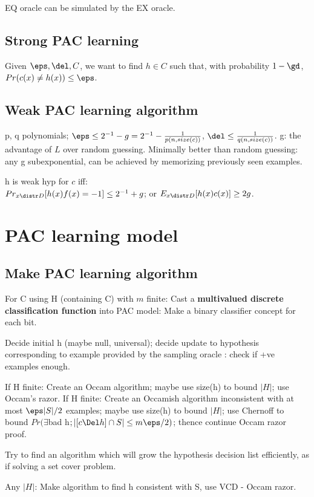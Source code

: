 \documentclass[oneside, article]{memoir}
\begin{document}
EQ oracle can be simulated by the EX oracle.

\subsection{Strong PAC learning}
Given $\eps, \del, C$, we want to find $h \in C$ such that, with probability $1 - \gd$, $Pr(c(x) \neq h(x)) \leq \eps$.

\subsection{Weak PAC learning algorithm}
p, q polynomials; $\eps \leq 2^{-1}-g = 2^{-1}-\frac{1}{p(n, size(c))}$, $\del \leq \frac{1}{q(n, size(c))}$. g: the advantage of $L$ over random guessing. Minimally better than random guessing: any g subexponential, can be achieved by memorizing previously seen examples.

h is weak hyp for $c$ iff: \\
$Pr_{x\distr D}[h(x)f(x)= -1] \leq 2^{-1}+g$; or $E_{x \distr D}[h(x)c(x)]\geq 2g$.

\section{PAC learning model}
\subsection{Make PAC learning algorithm}
For C using H (containing C) with $m$ finite: Cast a \textbf{multivalued discrete classification function} into PAC model: Make a binary classifier concept for each bit.

Decide initial h (maybe null, universal); decide update to hypothesis corresponding to example provided by the sampling oracle : check if +ve examples enough.

If H finite: Create an Occam algorithm; maybe use size(h) to bound $|H|$; use Occam's razor. If H finite: Create an Occamish algorithm inconsistent with at most $\eps|S|/2$ examples; maybe use size(h) to bound $|H|$; use Chernoff to bound $Pr(\exists $bad h$; |[c \Del h] \cap S| \leq m\eps/2)$; thence continue Occam razor proof.

Try to find an algorithm which will grow the hypothesis decision list efficiently, as if solving a set cover problem.

Any $|H|$: Make algorithm to find h consistent with S, use VCD - Occam razor.
\end{document}
